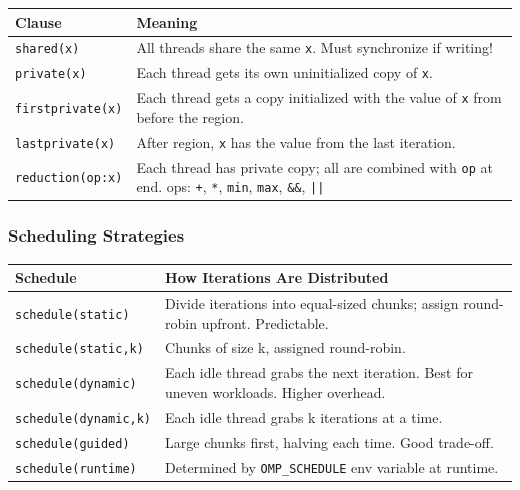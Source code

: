 \documentclass[11pt,a4paper]{article}
\newcommand{\code}[1]{\texttt{\small\colorbox{codebg}{\color{codekw}#1}}}
\begin{document}
\begin{center}
\begin{tabular}{L{3cm} L{11cm}}
\toprule
\textbf{Clause} & \textbf{Meaning} \\
\midrule
\code{shared(x)} & All threads share the same \code{x}. Must synchronize if writing! \\
\code{private(x)} & Each thread gets its own uninitialized copy of \code{x}. \\
\code{firstprivate(x)} & Each thread gets a copy initialized with the value of \code{x} from before the region. \\
\code{lastprivate(x)} & After region, \code{x} has the value from the last iteration. \\
\code{reduction(op:x)} & Each thread has private copy; all are combined with \code{op} at end. ops: \code{+}, \code{*}, \code{min}, \code{max}, \code{\&\&}, \code{||} \\
\bottomrule
\end{tabular}
\end{center}

\subsubsection{Scheduling Strategies}

\begin{center}
\begin{tabular}{L{4cm} L{9.5cm}}
\toprule
\textbf{Schedule} & \textbf{How Iterations Are Distributed} \\
\midrule
\code{schedule(static)} & Divide iterations into equal-sized chunks; assign round-robin upfront. Predictable. \\
\code{schedule(static,k)} & Chunks of size k, assigned round-robin. \\
\code{schedule(dynamic)} & Each idle thread grabs the next iteration. Best for uneven workloads. Higher overhead. \\
\code{schedule(dynamic,k)} & Each idle thread grabs k iterations at a time. \\
\code{schedule(guided)} & Large chunks first, halving each time. Good trade-off. \\
\code{schedule(runtime)} & Determined by \code{OMP\_SCHEDULE} env variable at runtime. \\
\bottomrule
\end{tabular}
\end{center}

\end{document}
